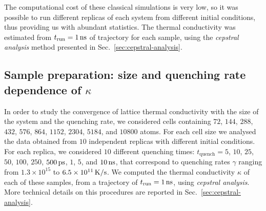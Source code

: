 The computational cost of these classical simulations is very low, so it was possible to run different replicas of each system from different initial conditions, thus providing us with abundant statistics. 
The thermal conductivity was estimated from $t_{\mathrm{run}} = 1\,\mathrm{ns}$ of trajectory for each sample, using the \emph{cepstral analysis} method presented in Sec.~\ref{sec:cepstral-analysis}.



\subsection{Sample preparation: size and quenching rate dependence of \texorpdfstring{$\kappa$}{thermal conductivity}}  \label{sec:results-class-quench}
In order to study the convergence of lattice thermal conductivity with the size of the system and the quenching rate, we considered cells containing $72$, $144$, $288$, $432$, $576$, $864$, $1152$, $2304$, $5184$, and $10800$ atoms. For each cell size we analysed the data obtained from $10$ independent replicas with different initial conditions. 
For each replica, we considered $10$ different quenching times: $t_{\mathrm{quench}} = 5$, $10$, $25$, $50$, $100$, $250$, $500\,\mathrm{ps}$, $1$, $5$, and $10\,\mathrm{ns}$, that correspond to quenching rates $\gamma$ ranging from $1.3\times 10^{15}$ to $6.5\times 10^{11}\,\mathrm{K/s}$.
We computed the thermal conductivity $\kappa$ of each of these samples, from a trajectory of $t_\mathrm{run}=1\,\mathrm{ns}$, using \emph{cepstral analysis}. More technical details on this procedures are reported in Sec.~\ref{sec:cepstral-analysis}. 

